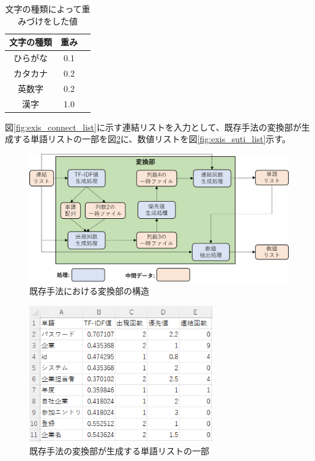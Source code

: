\begin{table}[t]
    \begin{center}      
        \caption{文字の種類によって重みづけをした値}\label{table:yusenti}
        \begin{tabular}{c|c|c}
        文字の種類  & 重み \\ \hline \hline
        ひらがな & 0.1 \\ \hline
        カタカナ	 & 0.2\\ \hline
        英数字  & 0.2\\ \hline
        漢字 & 1.0\\ \hline
        \end{tabular}
    \end{center}
\end{table}

図\ref{fig:exis_connect_list}に示す連結リストを入力として、既存手法の変換部が生成する単語リストの一部を図\ref{fig:exis_word_list}に、数値リストを図\ref{fig:exis_suti_list}示す。

\begin{figure}[tp]
    \begin{center}
        \includegraphics[width=1.0\columnwidth]{image/exis_transfer_structure.png}
        \caption{既存手法における変換部の構造}
        \label{fig:exis_transfer_structure}
    \end{center}
\end{figure}

\begin{figure}[tp]
    \begin{center}
        \includegraphics[width=300]{image/exis_word_list.png}
        \caption{既存手法の変換部が生成する単語リストの一部}
        \label{fig:exis_word_list}
    \end{center}
\end{figure}

